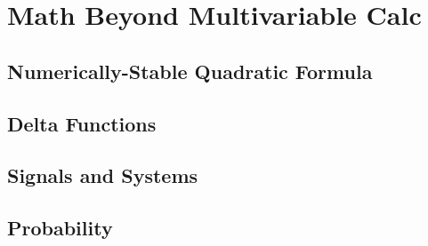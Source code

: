 \chapter{Math Beyond Multivariable Calc}
\section{Numerically-Stable Quadratic Formula}
\section{Delta Functions}
\section{Signals and Systems}
\section{Probability}

\newpage